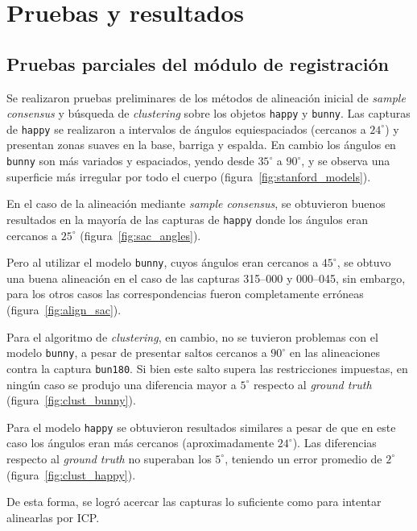 \chapter{Pruebas y resultados}
\section{Pruebas parciales del módulo de registración}
	Se realizaron pruebas preliminares de los métodos de alineación inicial
	de \emph{sample consensus} y búsqueda de \emph{clustering}
	sobre los objetos \texttt{happy} y \texttt{bunny}.
	Las capturas de \texttt{happy} se realizaron a intervalos de ángulos equiespaciados (cercanos a $24^{\circ}$) y
	presentan zonas suaves en la base, barriga y espalda.
	En cambio los ángulos en \texttt{bunny} son más variados y espaciados, yendo desde $35^{\circ}$ a $90^{\circ}$,
	y se observa una superficie más irregular por todo el cuerpo (figura~\ref{fig:stanford_models}).%

	En el caso de la alineación mediante \emph{sample consensus},
	se obtuvieron buenos resultados en la mayoría de las capturas de \texttt{happy}
	donde los ángulos eran cercanos a $25^{\circ}$ (figura~\ref{fig:sac_angles}).

	Pero al utilizar el modelo \texttt{bunny}, cuyos ángulos eran cercanos a $45^{\circ}$,
	se obtuvo una buena alineación en el caso de las capturas 315--000 y 000--045,
	sin embargo, para los otros casos las correspondencias fueron completamente erróneas (figura~\ref{fig:align_sac}).

	Para el algoritmo de \emph{clustering}, en cambio,
	no se tuvieron problemas con el modelo \texttt{bunny},
	a pesar de presentar saltos cercanos a $90^{\circ}$ en las alineaciones
	contra la captura \texttt{bun180}. Si bien este salto supera las restricciones impuestas,
	en ningún caso se produjo una diferencia mayor a $5^{\circ}$ respecto al \emph{ground truth} (figura~\ref{fig:clust_bunny}).

	Para el modelo \texttt{happy} se obtuvieron resultados similares a pesar de que en este
	caso los ángulos eran más cercanos (aproximadamente $24^{\circ}$).  Las
	diferencias respecto al \emph{ground truth} no superaban los $5^{\circ}$,
	teniendo un error promedio de $2^{\circ}$ (figura~\ref{fig:clust_happy}).

	De esta forma, se logró acercar las capturas lo suficiente como
	para intentar alinearlas por ICP.


